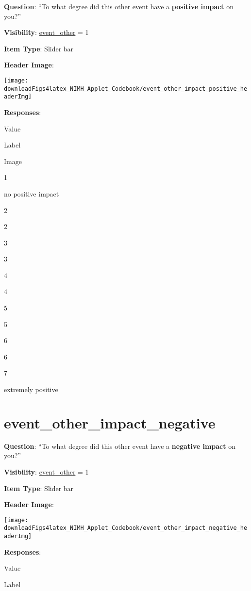 \documentclass[]{book}
\begin{document}
\textbf{Question}: ``To what degree did this other event have a \textbf{positive impact} on you?''

\textbf{Visibility}: \protect\hyperlink{event_other}{event\_other} = 1

\textbf{Item Type}: Slider bar

\textbf{Header Image}:

\begin{flushleft}\texttt{[image: downloadFigs4latex\_NIMH\_Applet\_Codebook/event\_other\_impact\_positive\_headerImg]} \end{flushleft}

\textbf{Responses}:

Value

Label

Image

1

no positive impact

2

2

3

3

4

4

5

5

6

6

7

extremely positive

\hypertarget{event_other_impact_negative}{%
\section{event\_other\_impact\_negative}\label{event_other_impact_negative}}

\textbf{Question}: ``To what degree did this other event have a \textbf{negative impact} on you?''

\textbf{Visibility}: \protect\hyperlink{event_other}{event\_other} = 1

\textbf{Item Type}: Slider bar

\textbf{Header Image}:

\begin{flushleft}\texttt{[image: downloadFigs4latex\_NIMH\_Applet\_Codebook/event\_other\_impact\_negative\_headerImg]} \end{flushleft}

\textbf{Responses}:

Value

Label
\end{document}
